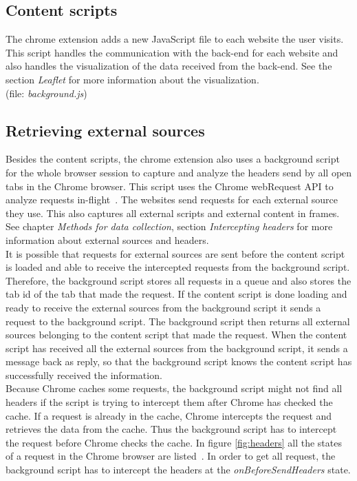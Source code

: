 \documentclass[twoside,openright,notitlepage]{uva-bachelor-thesis}
\begin{document}
\subsection{Content scripts}
The chrome extension adds a new JavaScript file to each website the user visits. This script handles the communication with the back-end for each website and also handles the visualization of the data received from the back-end. See the section \emph{Leaflet} for more information about the visualization.\\

(file: \emph{background.js})

\subsection{Retrieving external sources}
Besides the content scripts, the chrome extension also uses a background script for the whole browser session to capture and analyze the headers send by all open tabs in the Chrome browser. This script uses the Chrome webRequest API to analyze requests in-flight~\cite{google2}. The websites send requests for each external source they use. This also captures all external scripts and external content in frames. See chapter \emph{Methods for data collection}, section \emph{Intercepting headers} for more information about external sources and headers.\\

It is possible that requests for external sources are sent before the content script is loaded and able to receive the intercepted requests from the background script. Therefore, the background script stores all requests in a queue and also stores the tab id of the tab that made the request. If the content script is done loading and ready to receive the external sources from the background script it sends a request to the background script. The background script then returns all external sources belonging to the content script that made the request. When the content script has received all the external sources from the background script, it sends a message back as reply, so that the background script knows the content script has successfully received the information.\\

Because Chrome caches some requests, the background script might not find all headers if the script is trying to intercept them after Chrome has checked the cache. If a request is already in the cache, Chrome intercepts the request and retrieves the data from the cache. Thus the background script has to intercept the request before Chrome checks the cache. In figure \ref{fig:headers} all the states of a request in the Chrome browser are listed~\cite{google2}. In order to get all request, the background script has to intercept the headers at the \emph{onBeforeSendHeaders} state.\\
\end{document}
